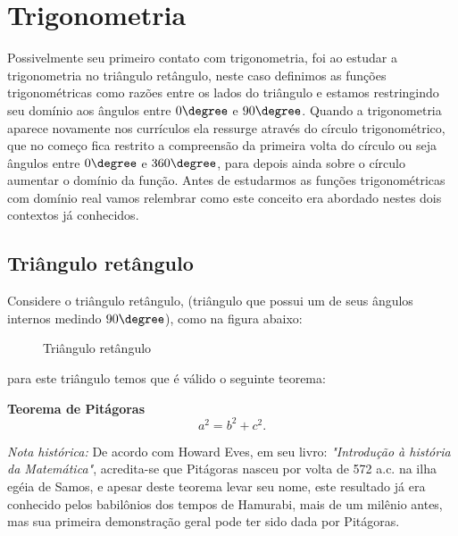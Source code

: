 
\chapter{Trigonometria}
 Possivelmente seu primeiro contato com trigonometria, foi ao estudar a trigonometria no triângulo retângulo, neste caso definimos as funções trigonométricas como razões entre os lados do triângulo e estamos restringindo seu domínio aos ângulos entre $0 \degree$ e $90 \degree$.
 Quando a trigonometria aparece novamente nos currículos ela ressurge através do círculo trigonométrico, que no começo fica restrito a compreensão da primeira volta do círculo ou seja ângulos entre $0 \degree$ e $360 \degree$, para depois ainda sobre o círculo aumentar o domínio da função.
 Antes de estudarmos as funções trigonométricas com domínio real vamos relembrar como este conceito era abordado nestes dois contextos já conhecidos.
 
 \section{Triângulo retângulo}

  Considere o triângulo retângulo, (triângulo que possui um de seus ângulos internos medindo $90 \degree$), como na figura abaixo:
  \begin{figure}[H]
   \centering
   \caption{Triângulo retângulo}
  \end{figure}
 para este triângulo temos que é válido o seguinte teorema:

 \vskip0.3cm

\colorbox{azul}{
 \begin{minipage}{0.9\linewidth}
 \begin{center}
 \textbf{Teorema de Pitágoras}
\begin{equation}
a^2= b^2 + c^2.
\end{equation}
 \end{center}
 \end{minipage}}

 \vskip0.3cm

 \textit{Nota histórica:} De acordo com Howard Eves, em seu livro: \textit{"Introdução à história da Matemática"}, acredita-se que Pitágoras nasceu por volta de 572 a.c. na ilha egéia de Samos, e apesar deste teorema levar seu nome, este resultado já era conhecido pelos babilônios dos tempos de Hamurabi, mais de um milênio antes, mas sua primeira demonstração geral pode ter sido dada por Pitágoras.
 
